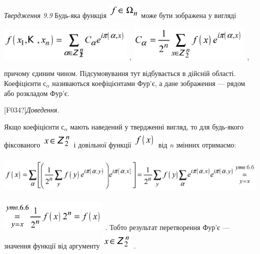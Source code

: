 \textit{Твердження 9.9  }Будь-яка функція 
\includegraphics[width=0.6252in,height=0.3016in]{crypt-img/crypt-img150.png} 
може бути зображена у вигляді

{\centering
 \includegraphics[width=2.5626in,height=0.6335in]{crypt-img/crypt-img151.png} , 
 \includegraphics[width=2.3154in,height=0.6689in]{crypt-img/crypt-img152.png} ,
\par}

причому єдиним чином. Підсумовування тут відбувається в дійсній області.
Коефіцієнти  ${\text{с}_{{\alpha }}}$ називаються коефіцієнтами Фур’є, а дане
зображення ---\textcolor{red}{ }рядом  або розкладом Фур’є.

\textlatin{[F034?]}\textit{Доведення.} 

Якщо коефіцієнти  ${\text{с}_{{\alpha }}}$ мають наведений у твердженні вигляд,
то для будь-якого фіксованого 
\includegraphics[width=0.6055in,height=0.3382in]{crypt-img/crypt-img153.png}  
і довільної функції 
\includegraphics[width=0.4689in,height=0.3228in]{crypt-img/crypt-img154.png}
\textbf{ }від\textbf{ }\textit{n}\textit{ }змінних отримаємо:

{\centering 
\includegraphics[width=6.3654in,height=0.7362in]{crypt-img/crypt-img155.png}
\par}

 \includegraphics[width=2.0634in,height=0.5854in]{crypt-img/crypt-img156.png} . 
Тобто результат перетворення Фур’є --- значення функції від аргументу 
\includegraphics[width=0.6102in,height=0.339in]{crypt-img/crypt-img157.png} .

